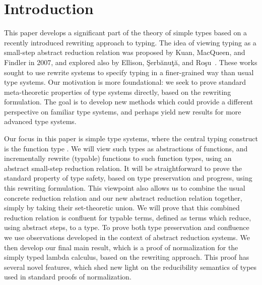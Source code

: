 \documentclass{LMCS}
\begin{document}
\section{Introduction}
\label{sec:intro}

This paper develops a significant part of the theory of simple types
based on a recently introduced rewriting approach to typing.  The idea
of viewing typing as a small-step abstract reduction relation was
proposed by Kuan, MacQueen, and Findler in 2007, and explored also by
Ellison, \c{S}erb\u{a}nu\c{t}\u{a}, and
Ro\c{s}u~\cite{rosu+10,ellison+08,kuan+07}.  These works sought to use
rewrite systems to specify typing in a finer-grained way than usual
type systems.  Our motivation is more foundational: we seek to prove
standard meta-theoretic properties of type systems directly, based on
the rewriting formulation.  The goal is to develop new methods which
could provide a different perspective on familiar type systems, and
perhaps yield new results for more advanced type systems.

Our focus in this paper is simple type systems, where the central
typing construct is the function type .  We will view such
types as abstractions of functions, and incrementally rewrite
(typable) functions to such function types, using an abstract
small-step reduction relation.  It will be straightforward to prove
the standard property of type safety, based on type preservation and
progress, using this rewriting formulation.  This viewpoint also
allows us to combine the usual concrete reduction relation and our new
abstract reduction relation together, simply by taking their
set-theoretic union.  We will prove that this combined reduction
relation is confluent for typable terms, defined as terms which
reduce, using abstract steps, to a type.  To prove both type preservation 
and confluence we use observations developed in the context of abstract
reduction systems.  We then develop our final main result, which is a
proof of normalization for the simply typed lambda calculus, based on
the rewriting approach.  This proof has several novel features, which
shed new light on the reducibility semantics of types used in standard
proofs of normalization.
\end{document}
